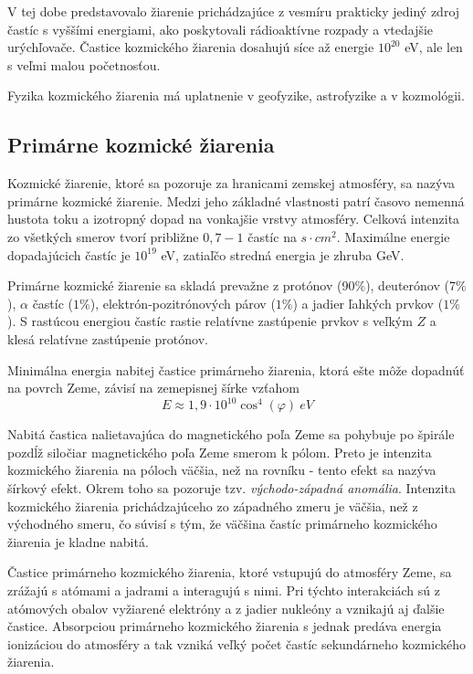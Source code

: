 \documentclass[../../main.tex]{subfiles}
\begin{document}
V tej dobe predstavovalo žiarenie prichádzajúce z vesmíru prakticky jediný zdroj častíc s vyššími energiami, ako poskytovali rádioaktívne rozpady a vtedajšie urýchľovače. Častice kozmického žiarenia dosahujú síce až energie $10^{20}$ eV, ale len s veľmi malou početnosťou. 

Fyzika kozmického žiarenia má uplatnenie v geofyzike, astrofyzike a v kozmológii.

\subsection{Primárne kozmické žiarenia}

Kozmické žiarenie, ktoré sa pozoruje za hranicami zemskej atmosféry, sa nazýva primárne kozmické žiarenie. Medzi jeho základné vlastnosti patrí časovo nemenná hustota toku a izotropný dopad na vonkajšie vrstvy atmosféry. Celková intenzita zo všetkých smerov tvorí približne $0,7-1$ častíc na $\unit{s\cdot cm^2}$. Maximálne energie dopadajúcich častíc je $10^{19}$ eV, zatiaľčo stredná energia je zhruba GeV.

Primárne kozmické žiarenie sa skladá prevažne z protónov (90$\%$), deuterónov (7$\%$), $\alpha$ častíc ($1\%$), elektrón-pozitrónových párov ($1\%$) a jadier ľahkých prvkov ($1\%$). S rastúcou energiou častíc rastie relatívne zastúpenie prvkov s veľkým $Z$ a klesá relatívne zastúpenie protónov.

Minimálna energia nabitej častice primárneho žiarenia, ktorá ešte môže dopadnúť na povrch Zeme, závisí na zemepisnej šírke vzťahom 
\begin{equation}
E\approx 1,9\cdot 10^{10} \cos^4(\varphi)\:\unit{eV}
\end{equation}

Nabitá častica nalietavajúca do magnetického poľa Zeme sa pohybuje po špirále pozdĺž siločiar magnetického poľa Zeme smerom k pólom. Preto je intenzita kozmického žiarenia na póloch väčšia, než na rovníku - tento efekt sa nazýva šírkový efekt. Okrem toho sa pozoruje tzv. \textit{východo-západná anomália}. Intenzita kozmického žiarenia prichádzajúceho zo západného zmeru je väčšia, než z východného smeru, čo súvisí s tým, že väčšina častíc primárneho kozmického žiarenia je kladne nabitá.

Častice primárneho kozmického žiarenia, ktoré vstupujú do atmosféry Zeme, sa zrážajú s atómami a jadrami a interagujú s nimi. Pri týchto interakciách sú z atómových obalov vyžiarené elektróny a z jadier nukleóny a vznikajú aj ďalšie častice. Absorpciou primárneho kozmického žiarenia s jednak predáva energia ionizáciou do atmosféry a tak vzniká veľký počet častíc sekundárneho kozmického žiarenia.
\end{document}
